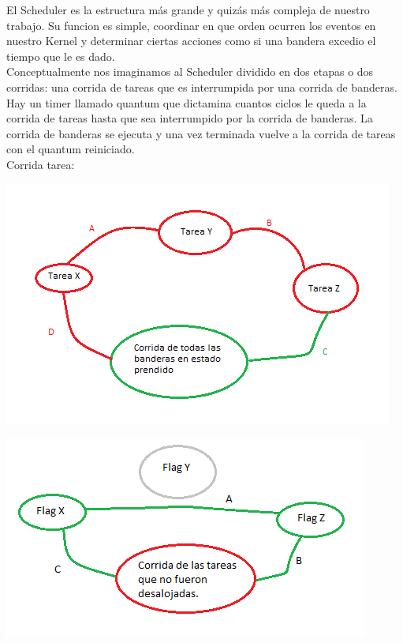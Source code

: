El Scheduler es la estructura m\'as grande y quiz\'as m\'as compleja de nuestro trabajo. Su funcion es simple, coordinar en 
que orden ocurren los eventos en nuestro Kernel y determinar ciertas acciones como si una bandera excedio el tiempo que le es dado.\\
Conceptualmente nos imaginamos al Scheduler dividido en dos etapas o dos corridas: una corrida de tareas que es interrumpida por una corrida de banderas.
Hay un timer llamado quantum que dictamina cuantos ciclos le queda a la corrida de tareas hasta que sea interrumpido por la corrida de banderas.
La corrida de banderas se ejecuta y una vez terminada vuelve a la corrida de tareas con el quantum reiniciado.\\
Corrida tarea:\\
\begin{center}
\includegraphics[scale=0.7]{imagenes/cicloBasicoTareas.png} 
\end{center}

\begin{center}
\includegraphics[scale=0.7]{imagenes/corridaFlags.png} 
\end{center}


